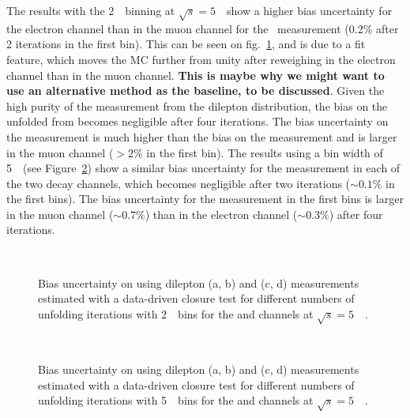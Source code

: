 The results with the 2~\GeV\ binning at $\sqrt{s} = 5$~\TeV\ show a higher bias uncertainty for the electron channel than in the muon channel for the \ptdilep\ measurement (0.2\% after 2 iterations in the first bin). This can be seen on fig.~\ref{fig:bias_dd_5_2GeV}, and is due to a fit feature, which moves the MC further from unity after reweighing in the electron channel than in the muon channel. \textbf{This is maybe why we might want to use an alternative method as the baseline, to be discussed}. Given the high purity of the \ptz measurement from the dilepton \pt distribution, the bias on the unfolded \ptz from \ptdilep becomes negligible after four iterations. The bias uncertainty on the \ut measurement is much higher than the bias on the \ptdilep measurement and is larger in the muon channel ($>2\%$ in the first bin).
The results using a bin width of 5~\GeV\ (see Figure~\ref{fig:bias_dd_5_5GeV}) show a similar bias uncertainty for the \ptdilep measurement in each of the two \Zboson decay channels, which becomes negligible after two iterations ($\sim 0.1\%$ in the first bins). The bias uncertainty for the \ut measurement in the first bins is larger in the muon channel ($\sim 0.7\%$) than in the electron channel ($\sim 0.3\%$) after four iterations.
\begin{figure}[h]
\centering
{}
\\
\caption{Bias uncertainty on \ptz using dilepton \pt (a, b) and \ut (c, d) measurements estimated with a data-driven closure test for different numbers of unfolding iterations with 2~\GeV\ bins for the \Zee and \Zmm channels at $\sqrt{s} = 5$~\TeV\ .}
\label{fig:bias_dd_5_2GeV}
\end{figure}

\begin{figure}[h]
\centering
{}
\\
\caption{Bias uncertainty on \ptz using dilepton \pt (a, b) and \ut (c, d) measurements estimated with a data-driven closure test for different numbers of unfolding iterations with 5~\GeV\ bins for the \Zee and \Zmm channels at $\sqrt{s} = 5$~\TeV\ .}
\label{fig:bias_dd_5_5GeV}
\end{figure}

